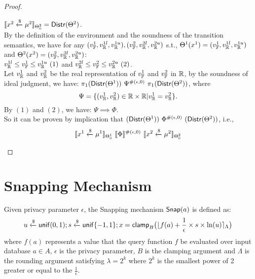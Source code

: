 \documentclass[a4paper,11pt]{article}
\begin{document}
\begin{proof}
\begin{itemize}
	$\llbracket x^2 \xleftarrow{\$} \mu^2 \rrbracket_{\Theta^2_0} = \mathsf{Distr}(\Theta^2)$. \\
	By the definition of the environment and the soundness of the transition semantics, we have for any $(v_{\mathbb{F}}^1, v_{\mathbb{R}}^{1l}, v_{\mathbb{R}}^{1u}), (v_{\mathbb{F}}^2, v_{\mathbb{R}}^{2l}, v_{\mathbb{R}}^{2u})$ s.t.,
	$\Theta^1 (x^1) = (v_{\mathbb{F}}^1, v_{\mathbb{R}}^{1l}, v_{\mathbb{R}}^{1u})$
	and
	$\Theta^2 (x^2) = (v_{\mathbb{F}}^2, v_{\mathbb{R}}^{2l}, v_{\mathbb{R}}^{2u})$:
	\\
	$ v_{\mathbb{R}}^{1l} \leq v_{\mathbb{F}}^1 \leq v_{\mathbb{R}}^{1u} ~ (1)$ 
	and
	$ v_{\mathbb{R}}^{2l} \leq v_{\mathbb{F}}^2 \leq v_{\mathbb{R}}^{2u} ~ (2)$.
	\\
	Let $v_{\mathbb{R}}^1$ and $v_{\mathbb{R}}^2$ be the real representation of $v_{\mathbb{F}}^1$ and $v_{\mathbb{F}}^2$ in $\mathbb{R}$, by the soundness of ideal judgment, we have:
	$\pi_1 (\mathsf{Distr}(\Theta^1)) ~ \Psi^{\#(\epsilon, 0)} ~ \pi_1 (\mathsf{Distr}(\Theta^2))$, where
	\[
		\Psi = \{(v_{\mathbb{R}}^1, v_{\mathbb{R}}^2) \in \mathbb{R} \times \mathbb{R}
		| 
		v_{\mathbb{R}}^1 = v_{\mathbb{R}}^2 \}.
	\]
	By $(1)$ and $(2)$, we have:
	$\Psi \implies \Phi$.
	\\
	So it can be proven by implication that 
	$(\mathsf{Distr}(\Theta^1)) ~ \Phi^{\#(\epsilon, 0)} ~ (\mathsf{Distr}(\Theta^2))$, i.e., 
	$$
	\llbracket x^1 \xleftarrow{\$} \mu^1 \rrbracket_{\Theta^1_0} 
		~ \llbracket \Phi \rrbracket^{\#(\epsilon, 0)} ~
		\llbracket x^2 \xleftarrow{\$} \mu^2 \rrbracket_{\Theta^2_0}
	$$
	\end{itemize}
\end{proof}


\newpage
\section{Snapping Mechanism}

\begin{defn}
Given privacy parameter $\epsilon$, the Snapping mechanism $\mathsf{Snap}(a)$ is defined as:
\[
	u \xleftarrow{\$} \mathsf{unif}(0,1); s \xleftarrow{\$} \mathsf{unif}\{-1, 1\};
	x = \mathsf{clamp}_B \big(
	\lfloor f(a) + \frac{1}{\epsilon} \times s \times \ln (u) \rceil_{\Lambda}
	\big)
\]
where $f(a)$ represents a value that the query function $f$ be evaluated over input database $a \in A$, $\epsilon$ is the privacy parameter, $B$ is the clamping argument and $\Lambda$ is the rounding argument satisfying $\lambda = 2^k$ where $2^k$ is the smallest power of 2 greater or equal to the $\frac{1}{\epsilon}$.
\end{defn}
\end{document}
